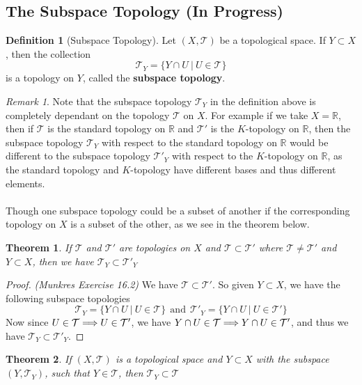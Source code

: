 \documentclass{article}
\newtheorem{theorem}{Theorem}[section]
\theoremstyle{remark}
\newtheorem*{remark}{Remark}
\theoremstyle{definition}
\newtheorem{definition}{Definition}[section]
\newcommand{\simplies}{\DOTSB\Longrightarrow}
\begin{document}
\subsection{The Subspace Topology (In Progress)}
\begin{definition}[Subspace Topology]
Let $(X, \mathcal{T})$ be a topological space. If $Y \subset X$, then the collection $$\mathcal{T}_Y = \{ Y \cap U \ | \  U \in \mathcal{T}\}$$ is a topology on $Y$, called the \textbf{subspace topology}.
\end{definition}
\medskip
\begin{remark}
Note that the subspace topology $\mathcal{T}_Y$ in the definition above is completely dependant on the topology $\mathcal{T}$ on $X$. For example if we take $X = \mathbb{R}$, then if $\mathcal{T}$ is the standard topology on $\mathbb{R}$ and $\mathcal{T'}$ is the $K$-topology on $\mathbb{R}$, then the subspace topology $\mathcal{T}_Y$ with respect to the standard topology on $\mathbb{R}$ would be different to the subspace topology $\mathcal{T'}_Y$ with respect to the $K$-topology on $\mathbb{R}$, as the standard topology and $K$-topology have different bases and thus different elements. \\ \\Though one subspace topology could be a subset of another if the corresponding topology on $X$ is a subset of the other, as we see in the theorem below.
\end{remark}
\medskip
\begin{theorem}
If $\mathcal{T}$ and $\mathcal{T'}$ are topologies on $X$ and $\mathcal{T} \subset \mathcal{T'}$ where $\mathcal{T} \neq \mathcal{T'}$ and $Y \subset X$, then we have $\mathcal{T}_Y \subset \mathcal{T'}_Y$
\end{theorem}

\begin{proof}
\textit{(Munkres Exercise 16.2)} We have $\mathcal{T} \subset \mathcal{T'}$. So given $Y \subset X$, we have the following subspace topologies $$\mathcal{T}_Y = \{Y \cap U \ | \ U \in \mathcal{T}\} \ \ \text{and} \ \ \mathcal{T'}_Y = \{ Y \cap U \ | \ U \in \mathcal{T'}\}$$
Now since $U \in \mathcal{T} \simplies U \in \mathcal{T'}$, we have $Y \cap U \in \mathcal{T} \simplies Y \cap U \in \mathcal{T'}$, and thus we have $\mathcal{T}_Y \subset \mathcal{T'}_Y$.
\end{proof}

\begin{theorem}
If $(X, \mathcal{T})$ is a topological space and $Y \subset X$ with the subspace $(Y, \mathcal{T}_Y)$, such that $Y \in \mathcal{T}$, then $ \mathcal{T}_Y \subset \mathcal{T}$
\end{theorem}
\end{document}
